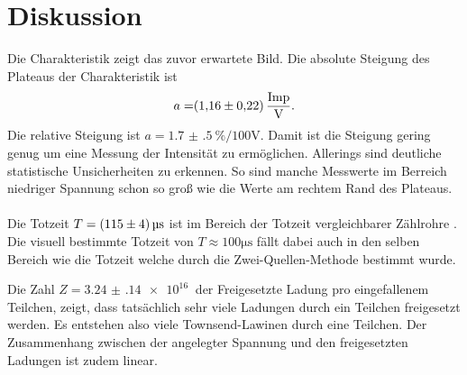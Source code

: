 \section{Diskussion}
\label{sec:Diskussion}
Die Charakteristik zeigt das zuvor erwartete Bild.
Die absolute Steigung des Plateaus der Charakteristik ist 
\begin{align*}
 a =& \SI{1.16(22)}{\frac{\text{Imp}}{\V}}. \\
\end{align*}
Die relative Steigung ist $a=\SI{1.7(5)}{\percent\per100\volt}$.
Damit ist die Steigung gering genug um eine Messung der Intensität zu ermöglichen.
Allerings sind deutliche statistische Unsicherheiten zu erkennen.
So sind manche Messwerte im Berreich niedriger Spannung schon so groß wie die Werte am rechtem Rand des Plateaus.
\\\\
Die Totzeit $T = \SI{115+-4}{\micro\second} $ ist im Bereich der Totzeit vergleichbarer Zählrohre \cite{anleitung603}.
Die visuell bestimmte Totzeit von $T \approx 100\si{\micro\second}$ fällt dabei auch in den selben Bereich wie die Totzeit welche durch die Zwei-Quellen-Methode bestimmt wurde.


Die Zahl $Z = \SI{3.24(14)e+16}{}$ der Freigesetzte Ladung pro eingefallenem Teilchen, zeigt, dass tatsächlich sehr viele Ladungen durch ein Teilchen freigesetzt werden.
Es entstehen also viele Townsend-Lawinen durch eine Teilchen.
Der Zusammenhang zwischen der angelegter Spannung und den freigesetzten Ladungen ist zudem linear.

